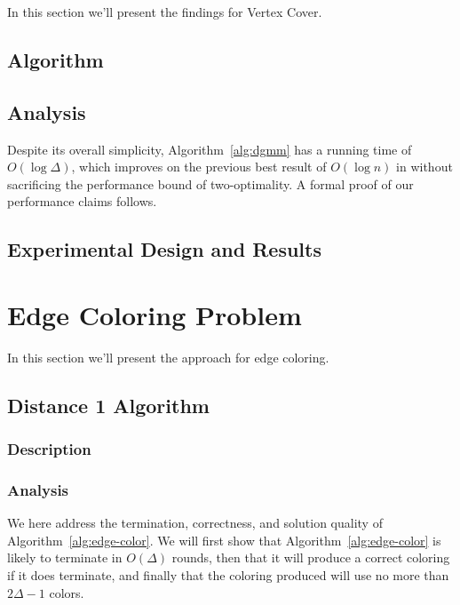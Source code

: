 \documentclass[twoside]{article}
\begin{document}
In this section we'll present the findings for Vertex Cover.

\subsection{Algorithm}


\subsection{Analysis}

\label{ssb:algorithms-dgmm-performance}

Despite its overall simplicity, Algorithm~\ref{alg:dgmm} has a running time of $O(\log \Delta)$, which improves on the previous best result of $O(\log n)$ in \cite{1582746} without sacrificing the performance bound of two-optimality. A formal proof of our performance claims follows.



\subsection{Experimental Design and Results}



\section{Edge Coloring Problem}

In this section we'll present the approach for edge coloring.

\subsection{Distance 1 Algorithm}
\subsubsection{Description}


\subsubsection{Analysis}
We here address the termination, correctness, and solution quality of Algorithm~\ref{alg:edge-color}. We will first show that Algorithm~\ref{alg:edge-color} is likely to terminate in $O(\Delta)$ rounds, then that it will produce a correct coloring if it does terminate, and finally that the coloring produced will use no more than $2\Delta - 1$ colors.


\end{document}
